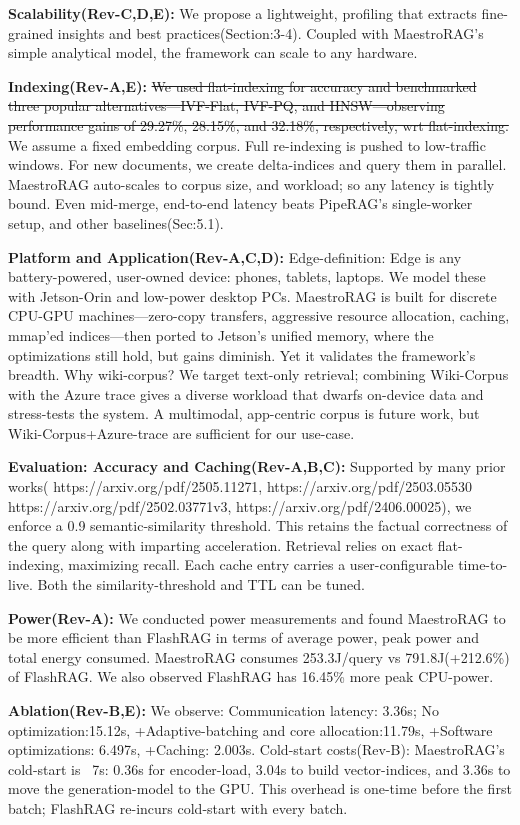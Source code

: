 \textbf{Scalability(Rev-C,D,E):} We propose a lightweight,  profiling that extracts fine-grained insights and best practices(Section:3-4). Coupled with MaestroRAG’s simple analytical model, the framework can scale to any hardware.

\textbf{Indexing(Rev-A,E):}
\st{We used flat-indexing for accuracy and benchmarked three popular alternatives—IVF-Flat, IVF-PQ, and HNSW—observing performance gains of 29.27\%, 28.15\%, and 32.18\%, respectively, wrt flat-indexing.}
We assume a fixed embedding corpus. Full re-indexing is pushed to low-traffic windows. For new documents, we create delta-indices and query them in parallel. MaestroRAG auto-scales to corpus size, and workload; so any latency is tightly bound. Even mid-merge, end-to-end latency beats PipeRAG’s single-worker setup, and other baselines(Sec:5.1).

\textbf{Platform and Application(Rev-A,C,D):}
Edge-definition: Edge is any battery-powered, user-owned device: phones, tablets, laptops. We model these with Jetson-Orin and low-power desktop PCs. MaestroRAG is built for discrete CPU-GPU machines—zero-copy transfers, aggressive resource allocation, caching, mmap’ed indices—then ported to Jetson’s unified memory, where the optimizations still hold, but gains diminish. Yet it validates the framework’s breadth.
Why wiki-corpus? We target text-only retrieval; combining Wiki-Corpus with the Azure trace gives a  diverse workload that dwarfs on-device data and stress-tests the system. A multimodal, app-centric corpus is future work, but Wiki-Corpus+Azure-trace are sufficient for our use-case.


\textbf{Evaluation:
Accuracy and Caching(Rev-A,B,C):} Supported by many prior works( https://arxiv.org/pdf/2505.11271, https://arxiv.org/pdf/2503.05530 https://arxiv.org/pdf/2502.03771v3, https://arxiv.org/pdf/2406.00025), we enforce a 0.9 semantic-similarity threshold. This retains the factual correctness of the query along with imparting acceleration. Retrieval relies on exact flat-indexing, maximizing recall. Each cache entry carries a user-configurable time-to-live. Both the similarity-threshold and TTL can be tuned.

\textbf{Power(Rev-A):} We conducted power measurements and found MaestroRAG to be more efficient than FlashRAG in terms of average power, peak power and total energy consumed. MaestroRAG consumes 253.3J/query vs 791.8J(+212.6\%) of FlashRAG. We also observed FlashRAG has 16.45\% more peak CPU-power.

\textbf{Ablation(Rev-B,E):}  We observe: Communication latency: 3.36s; No optimization:15.12s, +Adaptive-batching and core allocation:11.79s, +Software optimizations: 6.497s, +Caching: 2.003s.
Cold-start costs(Rev-B): MaestroRAG’s cold-start is ~7s: 0.36s for encoder-load, 3.04s to build vector-indices, and 3.36s to move the generation-model to the GPU. This overhead is one-time before the first batch; FlashRAG re-incurs cold-start with every batch.

